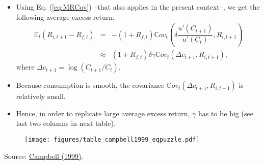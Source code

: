 \begin{frame}
\begin{footnotesize}
\begin{itemize}
	\item Using Eq. (\ref{eq:MRCov}) --that also applies in the present context--, we get the following average excess return:
	\begin{eqnarray*}
	\mathbb{E}_t(R_{i,t+1} - R_{f,t}) &=& - (1 + R_{f,t}) \mathbb{C}ov_t\left(\delta \dfrac{u'(C_{t+1})}{u'(C_{t})},R_{i,t+1}\right)\\
	&\approx& (1 + R_{f,t}) \delta \gamma  \mathbb{C}ov_t\left(\Delta c_{t+1},R_{i,t+1}\right),
	\end{eqnarray*}
	where $\Delta c_{t+1} = \log(C_{t+1}/C_t)$.
	\item Because consumption is smooth, the covariance $\mathbb{C}ov_t\left(\Delta c_{t+1},R_{i,t+1}\right)$ is relatively small.
	\item Hence, in order to replicate large average excess return, $\gamma$ has to be big (see last two columns in next table).
\end{itemize}
\end{footnotesize}
\end{frame}


\begin{frame}\label{slide:international}
\begin{footnotesize}
		\begin{figure}
			\texttt{[image: figures/table\_campbell1999\_eqpuzzle.pdf]}
		\end{figure}
		\begin{tiny}
		\begin{center}
		Source: \href{http://www.sciencedirect.com/science/article/pii/S1574004899100326}{Campbell (1999)}.
		\end{center}
		\end{tiny}
\end{footnotesize}
\end{frame}

